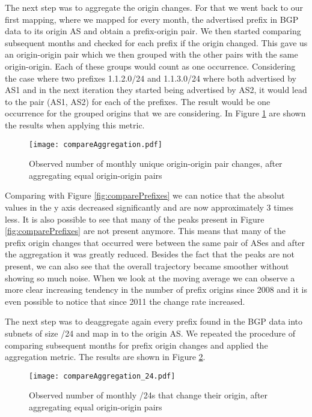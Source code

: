 \documentclass[11pt,a4paper]{scrreprt}
\begin{document}
The next step was to aggregate the origin changes. For that we went back to our first mapping, where we mapped for every month, the advertised prefix in BGP data to its origin AS and obtain a prefix-origin pair. We then started comparing subsequent months and checked for each prefix if the origin changed. This gave us an origin-origin pair which we then grouped with the other pairs with the same origin-origin. Each of these groups would count as one occurrence. Considering the case where two prefixes 1.1.2.0/24 and 1.1.3.0/24 where both advertised by AS1 and in the next iteration they started being advertised by AS2, it would lead to the pair (AS1, AS2) for each of the prefixes. The result would be one occurrence for the grouped origins that we are considering. In Figure \ref{fig:compareAggregation} are shown the results when applying this metric.       

\begin{figure}[!h]
\centering
\texttt{[image: compareAggregation.pdf]}
\caption{Observed number of monthly
unique origin-origin pair changes, after aggregating equal origin-origin pairs}
\label{fig:compareAggregation}
\end{figure}


Comparing with Figure \ref{fig:comparePrefixes} we can notice that the absolut values in the y axis decreased significantly and are now approximately 3 times less. It is also possible to see that many of the peaks present in Figure \ref{fig:comparePrefixes} are not present anymore. This means that many of the prefix origin changes that occurred were between the same pair of ASes and after the aggregation it was greatly reduced. Besides the fact that the peaks are not present, we can also see that the overall trajectory became smoother without showing so much noise. When we look at the moving average we can observe a more clear increasing tendency in the number of prefix origins since 2008 and it is even possible to notice that since 2011 the change rate increased. 

The next step was to deaggregate again every prefix found in the BGP data into subnets of size /24 and map in to the origin AS. We repeated the procedure of comparing subsequent months for prefix origin changes and applied the aggregation metric. The results are shown in Figure \ref{fig:compareAggregation24}.

\begin{figure}[!h]
\centering
\texttt{[image: compareAggregation\_24.pdf]}
\caption{Observed number of monthly
/24s that change their origin, after aggregating equal origin-origin pairs}
\label{fig:compareAggregation24}
\end{figure}
\end{document}

